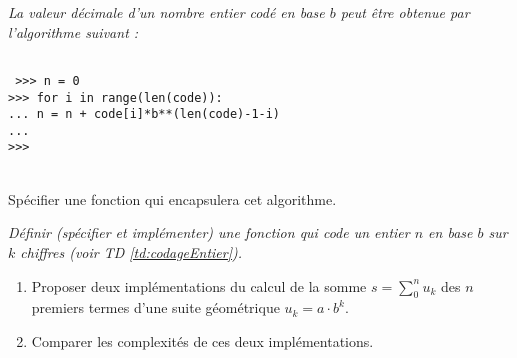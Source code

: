 \begin{td}\label{td:decoder}
\em
La valeur décimale d'un nombre entier
codé en base $b$ peut être obtenue par l'algorithme suivant :\\
{\tt \mbox{}\ \ \ \ }\begin{py}{7.5cm}\tt
>>> n = 0\\
>>> for i in range(len(code)):\\
...     n = n + code[i]*b**(len(code)-1-i)\\
... \\
>>> 
\end{py}\\[1mm]
Spécifier une fonction qui encapsulera cet algorithme.
\end{td}

\begin{td}\label{td:codage}
\em
Définir (spécifier et implémenter) une fonction qui 
code un entier $n$ en base $b$ sur $k$ chiffres
(voir TD \ref{td:codageEntier}).
\end{td}

\begin{td}\label{td:implem}
\em
\begin{enumerate}
\item Proposer deux implémentations du calcul de
la somme $s = \sum_0^n u_k$ des $n$ premiers termes d'une suite 
géométrique $u_k = a\cdot b^k$.
\item Comparer les complexités de ces deux im\-plé\-men\-ta\-tions.
\end{enumerate}
\end{td}

